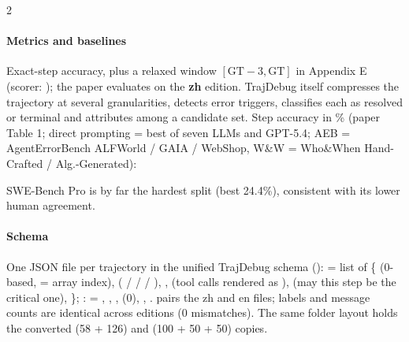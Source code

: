 \begin{multicols}{2}
\paragraph{Metrics and baselines} Exact-step accuracy, plus a relaxed window $[\mathrm{GT}{-}3, \mathrm{GT}]$ in Appendix E (scorer: ); the paper evaluates on the \textbf{zh} edition. TrajDebug itself compresses the trajectory at several granularities, detects error triggers, classifies each as resolved or terminal and attributes among a candidate set. Step accuracy in \% (paper Table 1; direct prompting = best of seven LLMs and GPT-5.4; AEB = AgentErrorBench ALFWorld / GAIA / WebShop, W\&W = Who\&When Hand-Crafted / Alg.-Generated):

\begin{center}\footnotesize\setlength{\tabcolsep}{2pt}
\end{center}
SWE-Bench Pro is by far the hardest split (best 24.4\%), consistent with its lower human agreement.

\paragraph{Schema} One JSON file per trajectory in the unified TrajDebug schema ():  = list of \{ (0-based, = array index),  ( /  /  / ), ,  (tool calls rendered as ),  (may this step be the critical one), \}; :  = , , ,  (0), , .  pairs the zh and en files; labels and message counts are identical across editions (0 mismatches). The same folder layout holds the converted  (58 + 126) and  (100 + 50 + 50) copies.
\end{multicols}

